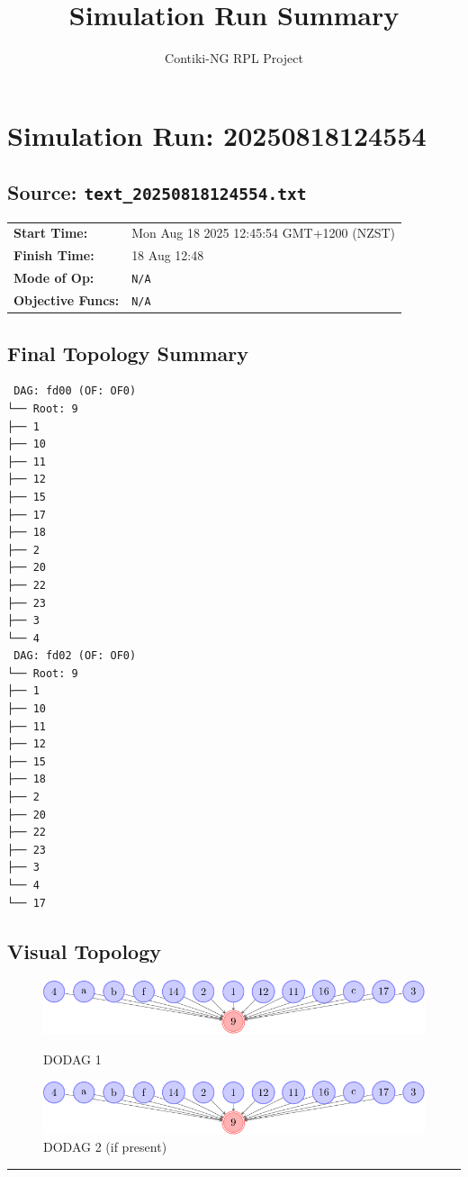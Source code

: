 \documentclass[a4paper]{article}
\begin{document}
\title{Simulation Run Summary}
\author{Contiki-NG RPL Project}
\maketitle


\section*{Simulation Run: 20250818124554}
\subsection*{Source: \texttt{text\_20250818124554.txt}}

\begin{tabular}{@{}ll}
\textbf{Start Time:} & Mon Aug 18 2025 12:45:54 GMT+1200 (NZST) \\
\textbf{Finish Time:} & 18 Aug 12:48 \\
\textbf{Mode of Op:} & \texttt{N/A} \\
\textbf{Objective Funcs:} & \texttt{N/A} \\
\end{tabular}

\subsection*{Final Topology Summary}
\begin{lstlisting}
 DAG: fd00 (OF: OF0)
└── Root: 9
├── 1
├── 10
├── 11
├── 12
├── 15
├── 17
├── 18
├── 2
├── 20
├── 22
├── 23
├── 3
└── 4
 DAG: fd02 (OF: OF0)
└── Root: 9
├── 1
├── 10
├── 11
├── 12
├── 15
├── 18
├── 2
├── 20
├── 22
├── 23
├── 3
└── 4
└── 17
\end{lstlisting}

\subsection*{Visual Topology}
\begin{figure}[h!]
    \centering
    \begin{minipage}{0.48\textwidth}
        \centering
        \includegraphics[page=1, width=\textwidth, trim=0 1cm 0 1cm, clip]{graph_20250818124554.pdf}
        \caption*{DODAG 1}
    \end{minipage}
    \hfill
    \begin{minipage}{0.48\textwidth}
        \centering
        \includegraphics[page=2, width=\textwidth, trim=0 1cm 0 1cm, clip]{graph_20250818124554.pdf}
        \caption*{DODAG 2 (if present)}
    \end{minipage}
\end{figure}

\hrule
\clearpage
\end{document}
